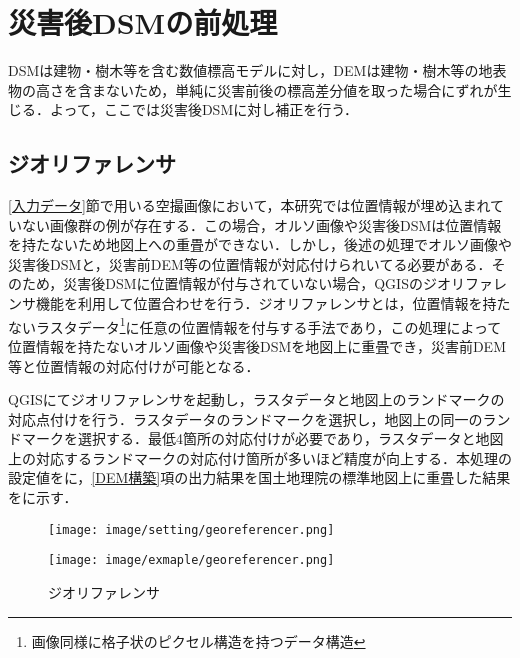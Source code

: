   \section{災害後DSMの前処理}
    \label{災害後DSMの前処理}
    DSMは建物・樹木等を含む数値標高モデルに対し，DEMは建物・樹木等の地表物の高さを含まないため，単純に災害前後の標高差分値を取った場合にずれが生じる．よって，ここでは災害後DSMに対し補正を行う．


    \subsection{ジオリファレンサ}
      \label{ジオリファレンサ}
      \ref{入力データ}節で用いる空撮画像において，本研究では位置情報が埋め込まれていない画像群の例が存在する．この場合，オルソ画像や災害後DSMは位置情報を持たないため地図上への重畳ができない．しかし，後述の処理でオルソ画像や災害後DSMと，災害前DEM等の位置情報が対応付けられいてる必要がある．そのため，災害後DSMに位置情報が付与されていない場合，QGISのジオリファレンサ機能を利用して位置合わせを行う．ジオリファレンサとは，位置情報を持たないラスタデータ\footnote{画像同様に格子状のピクセル構造を持つデータ構造}に任意の位置情報を付与する手法であり，この処理によって位置情報を持たないオルソ画像や災害後DSMを地図上に重畳でき，災害前DEM等と位置情報の対応付けが可能となる．

      QGISにてジオリファレンサを起動し，ラスタデータと地図上のランドマークの対応点付けを行う．ラスタデータのランドマークを選択し，地図上の同一のランドマークを選択する．最低4箇所の対応付けが必要であり，ラスタデータと地図上の対応するランドマークの対応付け箇所が多いほど精度が向上する．本処理の設定値をに，\ref{DEM構築}項の出力結果を国土地理院の標準地図\cite{標準地図}上に重畳した結果をに示す．

      \begin{figure}[t]
        \begin{minipage}[c]{0.45\hsize}
          \centering
          \texttt{[image: image/setting/georeferencer.png]}
          \label{ジオリファレンサ設定値}
        \end{minipage}
        \begin{minipage}[c]{0.45\hsize}
          \centering
          \texttt{[image: image/exmaple/georeferencer.png]}
          \label{ジオリファレンサ結果}
        \end{minipage}
        \caption{ジオリファレンサ}
      \end{figure}


